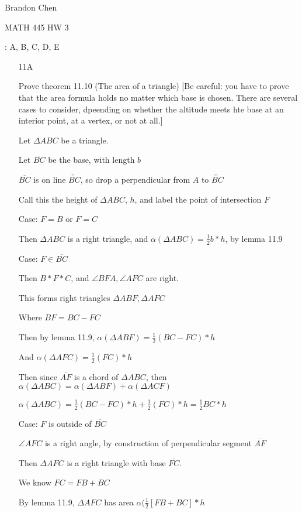 \documentclass[11pt]{article}
\newcommand{\lines}[1]{\overleftrightarrow{#1}}
\newcommand{\segment}[1]{\overline{#1}}
\begin{document}
\noindent Brandon Chen

\noindent MATH 445 HW 3

: A, B, C, D, E

\begin{itemize}

	\item[11A]
		
		Prove theorem 11.10 (The area of a triangle) [Be careful: you have to prove that the area formula holds no matter which base is chosen. There are several cases to consider, dpeending on whether the altitude meets hte base at an interior point, at a vertex, or not at all.]

		Let $\Delta ABC$ be a triangle.

		Let $\segment{BC}$ be the base, with length $b$

		$\segment{BC}$ is on line $\lines{BC}$, so drop a perpendicular from $A$ to $\lines{BC}$

		Call this the height of $\Delta ABC$, $h$, and label the point of intersection $F$

		Case: $F = B$ or $F = C$

		Then $\Delta ABC$ is a right triangle, and $\alpha(\Delta ABC) = \frac{1}{2}b*h$, by lemma 11.9

		Case: $F \in \segment{BC}$

		Then $B*F*C$, and $\angle BFA, \angle AFC$ are right.

		This forms right triangles $\Delta ABF, \Delta AFC$

		Where $BF = BC - FC$

		Then by lemma 11.9, $\alpha(\Delta ABF) = \frac{1}{2}(BC-FC)*h$

		And $\alpha(\Delta AFC) = \frac{1}{2}(FC)*h$

		Then since $\segment{AF}$ is a chord of $\Delta ABC$, then $\alpha(\Delta ABC) = \alpha(\Delta ABF) + \alpha(\Delta ACF)$

		$\alpha(\Delta ABC) = \frac{1}{2}(BC-FC)*h + \frac{1}{2}(FC)*h = \frac{1}{2}BC*h$

		Case: $F$ is outside of $\segment{BC}$

		$\angle AFC$ is a right angle, by construction of perpendicular segment $\segment{AF}$

		Then $\Delta AFC$ is a right triangle with base $\segment{FC}$. 

		We know $FC = FB + BC$
		
		By lemma 11.9, $\Delta AFC$ has area $\alpha(\frac{1}{2}[FB + BC]*h$


\end{itemize}
\end{document}
